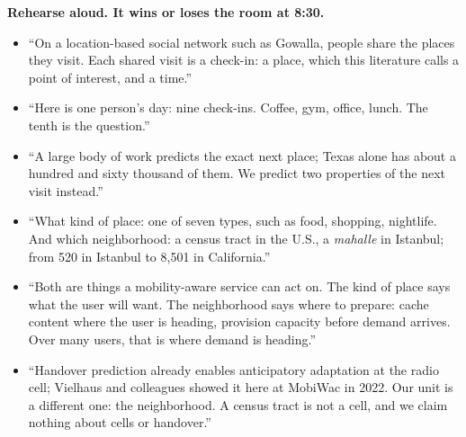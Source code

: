 \textbf{\color{alert}Rehearse aloud. It wins or loses the room at 8:30.}\par
\say
\begin{itemize}
  \item ``On a location-based social network such as Gowalla, people share the places they visit.
        Each shared visit is a check-in: a place, which this literature calls a point of interest, and
        a time.''
  \item ``Here is one person's day: nine check-ins. Coffee, gym, office, lunch. The tenth is the
        question.''
  \item ``A large body of work predicts the exact next place; Texas alone has about a hundred and
        sixty thousand of them. We predict two properties of the next visit instead.''
  \item ``What kind of place: one of seven types, such as food, shopping, nightlife. And which
        neighborhood: a census tract in the U.S., a \emph{mahalle} in Istanbul; from 520 in Istanbul to
        8,501 in California.''
  \item ``Both are things a mobility-aware service can act on. The kind of place says what the user will want. The
        neighborhood says where to prepare: cache content where the user is heading, provision
        capacity before demand arrives. Over many users, that is where demand is heading.''
  \item ``Handover prediction already enables anticipatory adaptation at the radio cell; Vielhaus and
        colleagues showed it here at MobiWac in 2022. Our unit is a different one: the neighborhood.
        A census tract is not a cell, and we claim nothing about cells or handover.''
\end{itemize}

